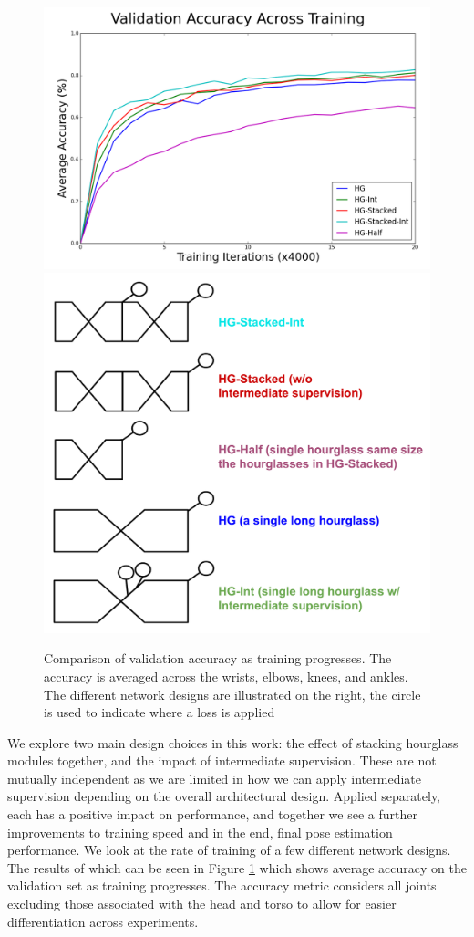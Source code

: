\documentclass[runningheads]{llncs}
\begin{document}
\begin{figure}[t]
\centering
\includegraphics[width=.55\textwidth]{img/ablation}
\includegraphics[width=.4\textwidth]{img/ablation-label}
\caption{ Comparison of validation accuracy as training
  progresses. The accuracy is averaged across the wrists, elbows,
  knees, and ankles. The different network designs are illustrated on
  the right, the circle is used to indicate where a loss is applied}
\label{fig:ablation}
\end{figure}

We explore two main design choices in this work: the effect of
stacking hourglass modules together, and the impact of intermediate
supervision. These are not mutually independent as we are limited in
how we can apply intermediate supervision depending on the overall
architectural design. Applied separately, each has a positive impact
on performance, and together we see a further improvements to training
speed and in the end, final pose estimation performance. We look at
the rate of training of a few different network designs. The results
of which can be seen in Figure \ref{fig:ablation} which shows average
accuracy on the validation set as training progresses. The accuracy
metric considers all joints excluding those associated with the head
and torso to allow for easier differentiation across experiments.
\end{document}
